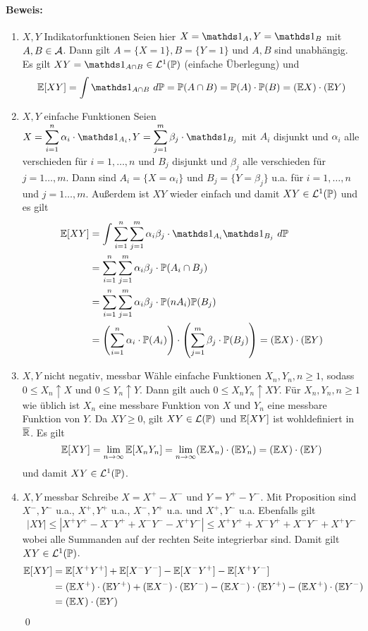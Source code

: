 \paragraph{Beweis:}
\begin{enumerate}[label=\Roman*.]
    \item $X,Y$ Indikatorfunktionen\newline
    Seien hier $X=\ind{A},Y=\ind{B}$ mit $A,B\in\mathcal{A}$. Dann gilt $A=\{X=1\},B=\{Y=1\}$ und $A,B$ sind unabh\"angig. Es gilt $XY=\ind{A\cap B}\in\mathcal{L}^1(\Pp)$ (einfache \"Uberlegung) und 
    $$\E [XY]=\int \ind{A\cap B}\ d\Pp=\Pp(A\cap B)=\Pp(A)\cdot \Pp(B)=(\E X)\cdot(\E Y)$$
    \item $X,Y$ einfache Funktionen\newline
    Seien $X=\displaystyle\sum_{i=1}^n\alpha_i\cdot\ind{A_i},Y=\sum_{j=1}^m\beta_j\cdot\ind{B_j}$ mit $A_i$ disjunkt und $\alpha_i$ alle verschieden f\"ur $i=1,\hdots,n$ und $B_j$ disjunkt und $\beta_j$ alle verschieden f\"ur $j=1\hdots,m$. Dann sind $A_i=\{X=\alpha_i\}$ und $B_j=\{Y=\beta_j\}$ u.a. f\"ur $i=1,\hdots,n$ und $j=1\hdots,m$. Au\ss{}erdem ist $XY$ wieder einfach und damit $XY\in\mathcal{L}^1(\mathbb{P})$ und es gilt
    \begin{align*}
        \E[XY]&=\int \sum_{i=1}^n\sum_{j=1}^m\alpha_i\beta_j\cdot\ind{A_i}\ind{B_j}\ d\Pp\\
        &=\sum_{i=1}^n\sum_{j=1}^m\alpha_i\beta_j\cdot\Pp(A_i\cap B_j)\\
        &=\sum_{i=1}^n\sum_{j=1}^m\alpha_i\beta_j\cdot\Pp(nA_i)\Pp(B_j)\\
        &=\left(\sum_{i=1}^n\alpha_i\cdot\Pp(A_i)\right)\cdot \left(\sum_{j=1}^m\beta_j\cdot\Pp(B_j)\right)=(\E X)\cdot(\E Y)
    \end{align*}
    \item $X,Y$ nicht negativ, messbar\newline
    W\"ahle einfache Funktionen $X_n,Y_n,n\geq1$, sodass $0\leq X_n\uparrow X$ und $0\leq Y_n\uparrow Y$. Dann gilt auch $0\leq X_nY_n\uparrow XY$. F\"ur $X_n,Y_n,n\geq1$ wie \"ublich ist $X_n$ eine messbare Funktion von $X$ und $Y_n$ eine messbare Funktion von $Y$. Da $XY\geq0$, gilt $XY\in\mathcal{L}(\mathbb{P})$ und $\mathbb{E}[XY]$ ist wohldefiniert in $\overline{\mathbb{R}}$. Es gilt
    $$\mathbb{E} [XY]=\lim_{n\to\infty}\mathbb{E}[X_nY_n]=\lim_{n\to\infty}(\mathbb{E} X_n)\cdot(\mathbb{E} Y_n)=(\mathbb{E} X)\cdot(\mathbb{E} Y)$$
    und damit $XY\in\mathcal{L}^1(\mathbb{P})$. 
    \item $X,Y$ messbar\newline
    Schreibe $X=X^+-X^-$ und $Y=Y^+-Y^-$. Mit Proposition sind $X^-,Y^-$ u.a., $X^+,Y^+$ u.a., $X^-,Y^+$ u.a. und $X^+,Y^-$ u.a. Ebenfalls gilt
    $$|XY|\leq|X^+Y^+-X^-Y^++X^-Y^--X^+Y^-|\leq X^+Y^++X^-Y^++X^-Y^-+X^+Y^-$$
    wobei alle Summanden auf der rechten Seite integrierbar sind. Damit gilt $XY\in\mathcal{L}^1(\mathbb{P})$.
    \begin{align*}
        \mathbb{E}[XY]&=\mathbb{E}[X^+Y^+]+\mathbb{E}[X^-Y^-]-\mathbb{E}[X^-Y^+]-\mathbb{E}[X^+Y^-]\\
        &=(\mathbb{E} X^+)\cdot(\mathbb{E} Y^+)+(\mathbb{E} X^-)\cdot(\mathbb{E} Y^-)-(\mathbb{E} X^-)\cdot(\mathbb{E} Y^+)-(\mathbb{E} X^+)\cdot(\mathbb{E} Y^-)\\
        &=(\mathbb{E} X)\cdot(\mathbb{E} Y)
    \end{align*}
    \qed
\end{enumerate}

